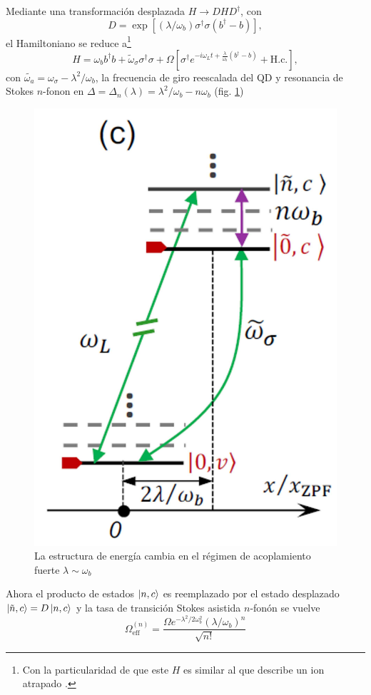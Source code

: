 \documentclass[../main.tex]{subfiles}
\begin{document}
Mediante una transformación desplazada $H \to DHD^\dagger$, con 
\begin{equation}
	D = \exp[(\lambda/\omega_b)\sigma^\dagger \sigma(b^\dagger - b)],
\end{equation}
el Hamiltoniano se reduce a\footnote{Con la particularidad de que este $H$ es similar al que describe un ion atrapado \parencite{Blockley1992}.}
\begin{equation}
	H = \omega_b b^\dagger b + \tilde{\omega}_\sigma \sigma^\dagger \sigma + \Omega[\sigma^\dagger e^{-i\omega_L t + \frac{\lambda}{\omega_b}(b^\dagger-b)} + \text{H.c.}],
\end{equation}
con $\tilde{\omega_a} = \omega_\sigma - \lambda^2/\omega_b$, la frecuencia de giro reescalada del QD y resonancia de Stokes $n$-fonon en $\Delta = \Delta_n(\lambda) = \lambda^2/\omega_b - n\omega_b$ (fig. \ref{fig:resonancesstokes2})

\begin{figure}[th]
	\centering
	\includegraphics[width=0.25\linewidth]{img/resonancesStokes2}
	\caption{La estructura de energía cambia en el régimen de acoplamiento fuerte $\lambda \sim \omega_b$ \parencite{Bin2020}}
	\label{fig:resonancesstokes2}
\end{figure}

Ahora el producto de estados $\ket{n,c}$ es reemplazado por el estado desplazado $\ket{\tilde{n}, c} = D\ket{n,c}$ y la tasa de transición Stokes asistida $n$-fonón se vuelve \parencite{Bin2020}
\begin{equation}\label{eq:effRabi2}
	\Omega_\text{eff}^{(n)} = \frac{\Omega e^{-\lambda^2/2\omega_b^2}(\lambda/\omega_b)^n}{\sqrt{n!}}
\end{equation}
\end{document}
